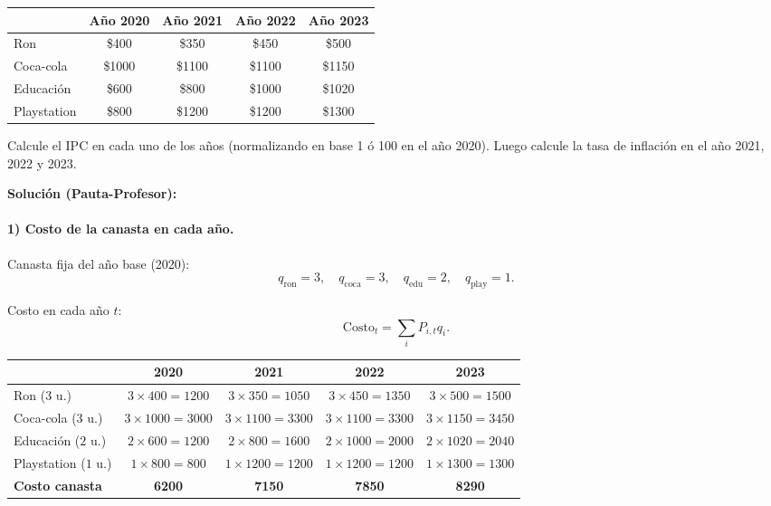 \documentclass[11pt,addpoints]{article}
\begin{document}
\begin{center}
\begin{tabular}{lcccc}
\toprule
            & Año 2020 & Año 2021 & Año 2022 & Año 2023 \\
\midrule
Ron         & \$400  & \$350  & \$450  & \$500  \\
Coca-cola   & \$1000 & \$1100 & \$1100 & \$1150 \\
Educación   & \$600  & \$800  & \$1000 & \$1020 \\
Playstation & \$800  & \$1200 & \$1200 & \$1300 \\
\bottomrule
\end{tabular}
\end{center}

Calcule el IPC en cada uno de los años (normalizando en base 1 ó 100 en el año 2020). Luego calcule la tasa de inflación en el año 2021, 2022 y 2023.

\vspace{0.2cm}
\textbf{Solución (Pauta-Profesor):}

\paragraph{1) Costo de la canasta en cada año.}

Canasta fija del año base (2020):
\[
q_{\text{ron}} = 3,\quad q_{\text{coca}} = 3,\quad q_{\text{edu}} = 2,\quad q_{\text{play}} = 1.
\]

Costo en cada año $t$:
\[
\text{Costo}_t = \sum_i P_{i,t} q_i.
\]

\newpage
\vspace*{0.5cm}
\begin{center}
\begin{tabular}{lcccc}
\toprule
            & 2020 & 2021 & 2022 & 2023 \\
\midrule
Ron ($3$ u.)         & $3\times 400 = 1200$ & $3\times 350 = 1050$ & $3\times 450 = 1350$ & $3\times 500 = 1500$ \\
Coca-cola ($3$ u.)   & $3\times 1000 = 3000$ & $3\times 1100 = 3300$ & $3\times 1100 = 3300$ & $3\times 1150 = 3450$ \\
Educación ($2$ u.)   & $2\times 600 = 1200$ & $2\times 800 = 1600$ & $2\times 1000 = 2000$ & $2\times 1020 = 2040$ \\
Playstation ($1$ u.) & $1\times 800 = 800$  & $1\times 1200 = 1200$ & $1\times 1200 = 1200$ & $1\times 1300 = 1300$ \\
\midrule
\textbf{Costo canasta} & \textbf{6200} & \textbf{7150} & \textbf{7850} & \textbf{8290} \\
\bottomrule
\end{tabular}
\end{center}
\end{document}
